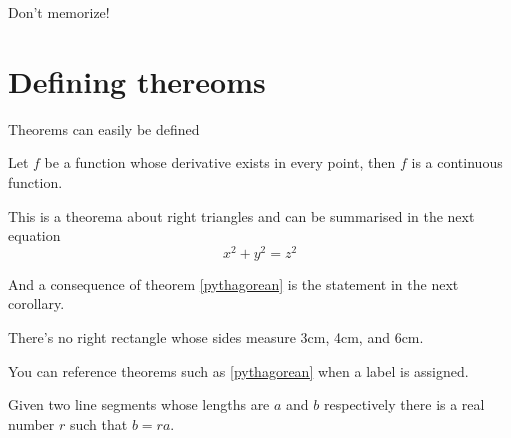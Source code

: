 \begin{claim}
Don’t memorize!
\end{claim}



\section{Defining thereoms}
Theorems can easily be defined
\newtheorem{prop}{Proposition}[section]
\begin{theorem}
Let $f$ be a function whose derivative exists in every point, then $f$ is 
a continuous function.
\end{theorem}

\begin{theorem}
\label{pythagorean}
This is a theorema about right triangles and can be summarised in the next 
equation 
\[ x^2 + y^2 = z^2 \]
\end{theorem}

And a consequence of theorem \ref{pythagorean} is the statement in the next 
corollary.

\begin{corollary}
There's no right rectangle whose sides measure 3cm, 4cm, and 6cm.
\end{corollary}

You can reference theorems such as \ref{pythagorean} when a label is assigned.

\begin{lemma}
Given two line segments whose lengths are $a$ and $b$ respectively there is a 
real number $r$ such that $b=ra$.
\end{lemma}

\section{}




\section{}

\section{}



\section{}


